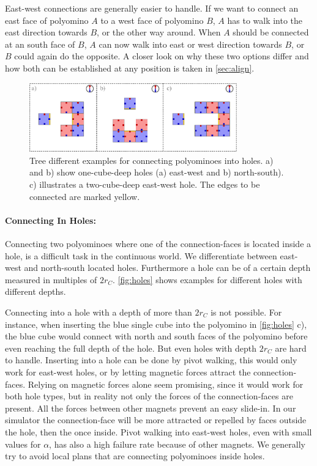 East-west connections are generally easier to handle.
If we want to connect an east face of polyomino $A$ to a west face of polyomino $B$, $A$ has to walk into the east direction towards $B$, or the other way around.
When $A$ should be connected at an south face of $B$, $A$ can now walk into east or west direction towards $B$, or $B$ could again do the opposite.
A closer look on why these two options differ and how both can be established at any position is taken in \autoref{sec:align}.

\begin{figure}
	\centering
	\includegraphics[width=0.80\textwidth]{figures/holes.pdf}
	\caption{Tree different examples for connecting polyominoes into holes. a) and b) show one-cube-deep holes (a) east-west and b) north-south). c) illustrates a two-cube-deep east-west hole. The edges to be connected are marked yellow.}
	\label{fig:holes}
\end{figure}

\paragraph{Connecting In Holes:}

Connecting two polyominoes where one of the connection-faces is located inside a hole, is a difficult task in the continuous world.
We differentiate between east-west and north-south located holes.
Furthermore a hole can be of a certain depth measured in multiples of $2 r_C$.
\autoref{fig:holes} shows examples for different holes with different depths.

Connecting into a hole with a depth of more than $2 r_C$ is not possible.
For instance, when inserting the blue single cube into the polyomino in \autoref{fig:holes} c), the blue cube would connect with north and south faces of the polyomino before even reaching the full depth of the hole.
But even holes with depth $2 r_C$ are hard to handle.
Inserting into a hole can be done by pivot walking, this would only work for east-west holes, or by letting magnetic forces attract the connection-faces.
Relying on magnetic forces alone seem promising, since it would work for both hole types, but in reality not only the forces of the connection-faces are present.
All the forces between other magnets prevent an easy slide-in.
In our simulator the connection-face will be more attracted or repelled by faces outside the hole, then the once inside.
Pivot walking into east-west holes, even with small values for $\alpha$, has also a high failure rate because of other magnets.
We generally try to avoid local plans that are connecting polyominoes inside holes.  

